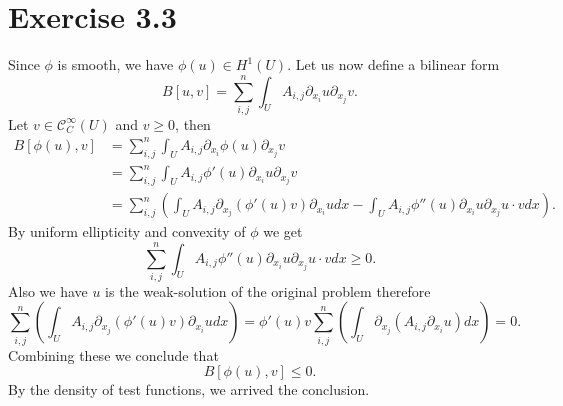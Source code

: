 \documentclass{article}
\begin{document}
\section*{Exercise 3.3}
Since $\phi$ is smooth, we have $\phi(u)\in H^1(U)$. Let us now define a bilinear form
\begin{equation*}
B[u,v] = \sum_{i,j}^n \int_{U} A_{i,j}\partial_{x_i}u\partial_{x_j}v.
\end{equation*}
Let $v\in\mathcal{C}^\infty_C(U)$ and $v\geq0$, then 
\begin{align*}
B[\phi(u),v] & = \sum_{i,j}^n \int_{U} A_{i,j}\partial_{x_i}\phi(u)\partial_{x_j}v\\
& = \sum_{i,j}^n \int_{U} A_{i,j}\phi'(u)\partial_{x_i}u\partial_{x_j}v\\
& = \sum_{i,j}^n \left(\int_{U} A_{i,j}\partial_{x_j}(\phi'(u)v)\partial_{x_i}udx-\int_{U} A_{i,j}\phi''(u)\partial_{x_i}u\partial_{x_j}u \cdot vdx\right).
\end{align*}
By uniform ellipticity and convexity of $\phi$ we get 
\begin{equation*}
\sum_{i,j}^n\int_{U} A_{i,j}\phi''(u)\partial_{x_i}u\partial_{x_j}u \cdot vdx \geq 0.
\end{equation*}
Also we have $u$ is the weak-solution of the original problem therefore
\begin{equation*}
\sum_{i,j}^n \left(\int_{U} A_{i,j}\partial_{x_j}(\phi'(u)v)\partial_{x_i}udx\right) = \phi'(u)v\sum_{i,j}^n \left(\int_{U} \partial_{x_j}(A_{i,j}\partial_{x_i}u)dx\right)=0.
\end{equation*}
Combining these we conclude that 
\begin{equation*}
B[\phi(u),v]\leq0.
\end{equation*}
By the density of test functions, we arrived the conclusion.
\end{document}
